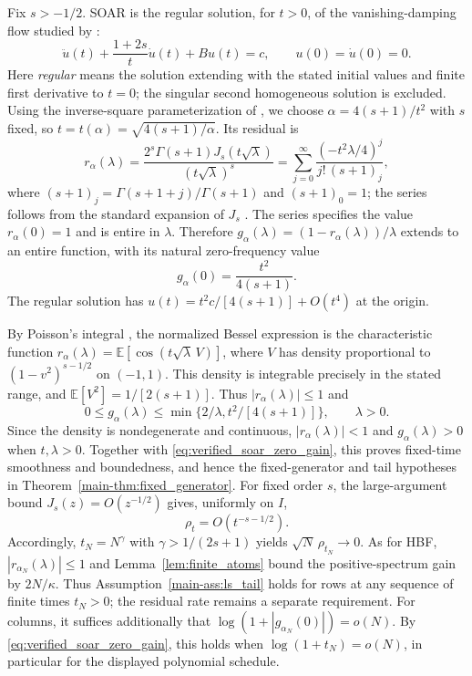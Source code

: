 \documentclass[11pt,a4paper,leqno]{article}
\numberwithin{equation}{section}
\numberwithin{figure}{section}
\numberwithin{table}{section}
\theoremstyle{plain}
\theoremstyle{definition}
\theoremstyle{remark}
\newcommand{\E}{\mathbb E}
\begin{document}
Fix $s>-1/2$.  SOAR is the regular solution, for $t>0$, of the vanishing-damping flow
studied by \citet[Section~6, Lemma~23]{bot2022convergence}:
\begin{equation*}
 \ddot u(t)+\frac{1+2s}{t}\dot u(t)+Bu(t)=c,
 \qquad u(0)=\dot u(0)=0.
\end{equation*}
Here \emph{regular} means the solution extending with the stated initial
values and finite first derivative to $t=0$; the singular second
homogeneous solution is excluded. Using the inverse-square parameterization of \citet[Example~3.5]{wang2024linear}, we choose $\alpha=4(s+1)/t^2$ with $s$ fixed, so $t=t(\alpha)=\sqrt{4(s+1)/\alpha}$.
Its residual is
\begin{equation}\label{eq:verified_soar_residual}
 r_\alpha(\lambda)=
 \frac{2^s\Gamma(s+1)J_s(t\sqrt\lambda)}{(t\sqrt\lambda)^s}
 =\sum_{j=0}^{\infty}
      \frac{(-t^2\lambda/4)^j}{j!\,(s+1)_j},
\end{equation}
where $(s+1)_j=\Gamma(s+1+j)/\Gamma(s+1)$ and $(s+1)_0=1$;
the series follows from the standard expansion of $J_s$
\citep[Eq.~(10.2.2)]{nist2010handbook}.
The series specifies the value $r_\alpha(0)=1$ and is entire in $\lambda$.
Therefore $g_\alpha(\lambda)=(1-r_\alpha(\lambda))/\lambda$ extends to an entire function,
with its natural zero-frequency value
\begin{equation}\label{eq:verified_soar_zero_gain}
 g_\alpha(0)=\frac{t^2}{4(s+1)}.
\end{equation}
The regular solution has
$u(t)=t^2c/[4(s+1)]+O(t^4)$ at the origin.

By Poisson's integral \citep[Eq.~(10.9.4)]{nist2010handbook},
the normalized Bessel expression is the characteristic function
$r_\alpha(\lambda)=\E[\cos(t\sqrt\lambda\,V)]$, where $V$ has density
proportional to $(1-v^2)^{s-1/2}$ on $(-1,1)$.
This density is integrable precisely in the stated range, and
$\E[V^2]=1/[2(s+1)]$.  Thus $|r_\alpha(\lambda)|\leq1$ and
\begin{equation*}
 0\leq g_\alpha(\lambda)
 \leq\min\{2/\lambda,t^2/[4(s+1)]\},\qquad \lambda>0.
\end{equation*}
Since the density is nondegenerate and continuous,
$|r_\alpha(\lambda)|<1$ and $g_\alpha(\lambda)>0$ when $t,\lambda>0$.
Together with \eqref{eq:verified_soar_zero_gain}, this proves
fixed-time smoothness and boundedness, and hence the fixed-generator
and tail hypotheses in Theorem~\ref{main-thm:fixed_generator}.
For fixed order $s$, the large-argument bound $J_s(z)=O(z^{-1/2})$
\citep[Eq.~(10.17.3)]{nist2010handbook}
gives, uniformly on $I$,
\[
 \rho_t=O(t^{-s-1/2}).
\]
Accordingly, $t_N=N^\gamma$ with $\gamma>1/(2s+1)$ yields
$\sqrt N\,\rho_{t_N}\to0$.
As for HBF, $|r_{\alpha_N}(\lambda)|\leq1$ and
Lemma~\ref{lem:finite_atoms} bound the positive-spectrum gain by $2N/\kappa$.
Thus Assumption~\ref{main-ass:ls_tail} holds for rows at any sequence of finite
times $t_N>0$; the residual rate remains a separate requirement.
For columns, it suffices additionally that
$\log(1+|g_{\alpha_N}(0)|)=o(N)$.
By \eqref{eq:verified_soar_zero_gain}, this holds when
$\log(1+t_N)=o(N)$, in particular for the displayed polynomial schedule.
\end{document}
